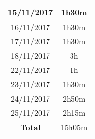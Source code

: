 \begin{tabular}{|c|c|}

	\hline

15/11/2017	& 1h30m \\ 

	\hline 

16/11/2017	& 1h30m \\ 

	\hline 

17/11/2017	& 1h30m \\ 

	\hline 

18/11/2017	& 3h \\ 

	\hline 

22/11/2017	& 1h \\ 

	\hline 

23/11/2017	& 1h30m \\ 

	\hline 

24/11/2017	& 2h50m \\ 

	\hline 

25/11/2017	& 2h15m \\ 

	\hline

\textbf{Total}	& 15h05m \\

	\hline

\end{tabular}